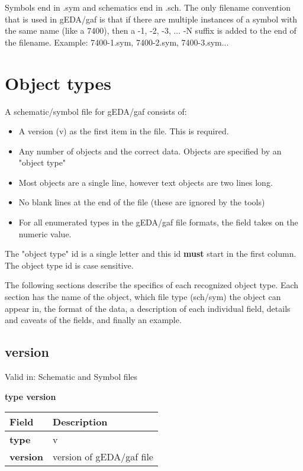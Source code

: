 \documentclass{article}
\begin{document}
Symbols end in .sym and schematics end in .sch.  The only filename convention 
that is used in gEDA/gaf is that if there are multiple instances of a symbol
with the same name (like a 7400), then a -1, -2, -3, ... -N suffix is added
to the end of the filename.  Example: 7400-1.sym, 7400-2.sym, 7400-3.sym...

\section{Object types}

A schematic/symbol file for gEDA/gaf consists of:

\begin{itemize}
 \item A version (v) as the first item in the file.  This is required.
 \item Any number of objects and the correct data.  Objects are specified 
       by an "object type"
 \item Most objects are a single line, however text objects are two lines long.
 \item No blank lines at the end of the file (these are ignored by the tools)
 \item For all enumerated types in the gEDA/gaf file formats, the field takes
       on the numeric value.
\end{itemize}

The "object type" id is a single letter and this id {\bf must} start in the 
first column.  The object type id is case sensitive.

The following sections describe the specifics of each recognized object 
type.  Each section has the name of the object, which file type (sch/sym)
the object can appear in, the format of the data, a description of
each individual field, details and caveats of the fields, and finally
an example.

\subsection{version}

Valid in: Schematic and Symbol files

{\bf type version}

\begin{table}[h]
\begin{tabular}{|l|l|} \hline
Field & Description \\ \hline \hline
{\bf type} & v \\ \hline
{\bf version} & version of gEDA/gaf file \\ \hline
\end{tabular}
\end{table}
\end{document}
